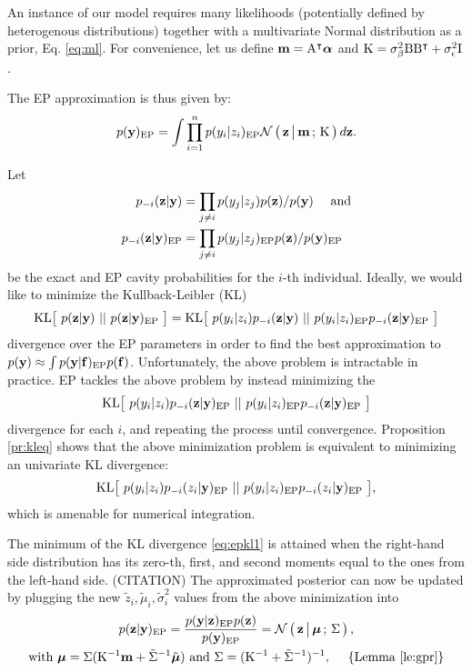 An instance of our model requires many likelihoods (potentially defined by
heterogenous distributions) together with a multivariate Normal distribution
as a prior, Eq. \eqref{eq:ml}.
For convenience, let us define $\mathbf m = \mathrm A^\intercal \boldsymbol\alpha$
and $\mathrm K = \sigma^2_{\beta} \mathrm B\mathrm B^\intercal + \sigma^2_{\epsilon}
\mathrm I$.

The EP approximation is thus given by:
\begin{align*}
p(\mathbf y)_{\text{EP}} = \int \prod_{i=1}^n p(y_i|z_i)_{\text{EP}}
  \mathcal{N}\left(\, { {\mathbf z} \, \big| \, {\mathbf m} } \,;\, { {\mathrm K} } \,\right) d\mathbf z.
\end{align*}

Let
\begin{align*}
    p_{-i}(\mathbf z|\mathbf y) &= \prod_{j\neq i} p(y_j|z_j) p(\mathbf z) / p(\mathbf y)
        \quad\text{ and}\\
    p_{-i}(\mathbf z|\mathbf y)_{\text{EP}} &= \prod_{j\neq i} p(y_j|z_j)_{\text{EP}} p(\mathbf z) / p(\mathbf y)_{\text{EP}}
\end{align*}
be the exact and EP cavity probabilities for the $i$-th individual.
Ideally, we would like to minimize the Kullback-Leibler (KL)
\begin{align*}
    \mathrm{KL}\big[~ p(\mathbf z|\mathbf y) ~||~ p(\mathbf z|\mathbf y)_{\text{EP}} ~\big] =
      \mathrm{KL}\big[~  p(y_i|z_i) p_{-i}(\mathbf z|\mathbf y)  ~||~  p(y_i|z_i)_{\text{EP}} p_{-i}(\mathbf z|\mathbf y)_{\text{EP}}  ~\big]
\end{align*}
divergence over the EP parameters in order to find the best approximation to
$p(\mathbf y) \approx \int p(\mathbf y | \mathbf f)_{\text{EP}} p(\mathbf f)$.
Unfortunately, the above problem is intractable in practice.
EP tackles the above problem by instead minimizing the
\begin{align}\label{eq:epkl0}
\mathrm{KL}\big[~  p(y_i|z_i) p_{-i}(\mathbf z | \mathbf y)_{\text{EP}}  ~||~ 
     p(y_i|z_i)_{\text{EP}} p_{-i}(\mathbf z | \mathbf y)_{\text{EP}}  ~\big]
\end{align}
divergence for each $i$, and repeating the process until convergence.
Proposition \eqref{pr:kleq} shows that the above minimization problem is
equivalent to minimizing an univariate KL divergence:
\begin{align}\label{eq:epkl1}
\mathrm{KL}\big[~  p(y_i|z_i) p_{-i}(z_i | \mathbf y)_{\text{EP}}  ~||~ 
     p(y_i|z_i)_{\text{EP}} p_{-i}(z_i | \mathbf y)_{\text{EP}}  ~\big],
\end{align}
which is amenable for numerical integration.

The minimum of the KL divergence \eqref{eq:epkl1} is attained when the
right-hand side distribution has its zero-th, first, and second moments equal
to the ones from the left-hand side. (CITATION)
The approximated posterior can now be updated by plugging the new
$\tilde z_i, \tilde\mu_i, \tilde\sigma^2_i$ values from the above minimization
into
\begin{gather}
  p(\mathbf z| \mathbf y)_{\text{EP}}
    = \frac{p(\mathbf y|\mathbf z)_{\text{EP}}p(\mathbf z)}{p(\mathbf y)_{\text{EP}}} =
      \mathcal{N}\left(\, { {\mathbf z} \, \big| \, {\boldsymbol\mu} } \,;\, { {\Sigma} } \,\right),\label{eq:pep}\\
        \text{with } \boldsymbol\mu = \Sigma(\mathrm K^{-1} \mathbf m
        + \tilde{\Sigma}^{-1} \tilde{\boldsymbol\mu})
    \text{ and }
    \Sigma = (\mathrm K^{-1} + \tilde{\Sigma}^{-1})^{-1},
      ~~~~ \{\text{Lemma \ref{le:gpr}}\}\nonumber
\end{gather}


